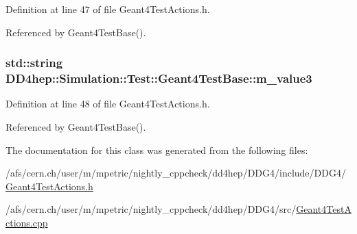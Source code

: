 Definition at line 47 of file Geant4TestActions.h.

Referenced by Geant4TestBase().\hypertarget{class_d_d4hep_1_1_simulation_1_1_test_1_1_geant4_test_base_a47f59388ee7476f251564abf651de4b5}{
\subsubsection[{m\_\-value3}]{\setlength{\rightskip}{0pt plus 5cm}std::string {\bf DD4hep::Simulation::Test::Geant4TestBase::m\_\-value3}}}
\label{class_d_d4hep_1_1_simulation_1_1_test_1_1_geant4_test_base_a47f59388ee7476f251564abf651de4b5}


Definition at line 48 of file Geant4TestActions.h.

Referenced by Geant4TestBase().

The documentation for this class was generated from the following files:\begin{DoxyCompactItemize}
\item 
/afs/cern.ch/user/m/mpetric/nightly\_\-cppcheck/dd4hep/DDG4/include/DDG4/\hyperlink{_geant4_test_actions_8h}{Geant4TestActions.h}\item 
/afs/cern.ch/user/m/mpetric/nightly\_\-cppcheck/dd4hep/DDG4/src/\hyperlink{_geant4_test_actions_8cpp}{Geant4TestActions.cpp}\end{DoxyCompactItemize}
